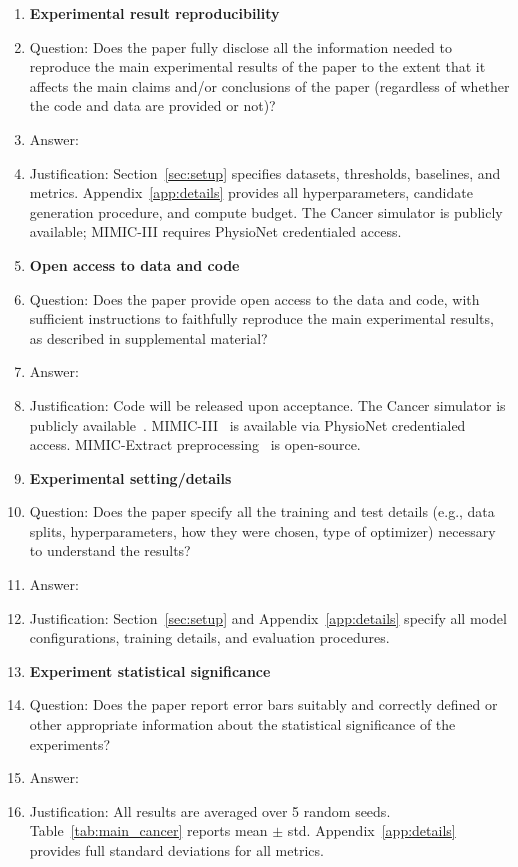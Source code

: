 \documentclass{article}
\begin{document}
\begin{enumerate}
\item {\bf Experimental result reproducibility}
    \item[] Question: Does the paper fully disclose all the information needed to reproduce the main experimental results of the paper to the extent that it affects the main claims and/or conclusions of the paper (regardless of whether the code and data are provided or not)?
    \item[] Answer: \answerYes{}
    \item[] Justification: Section~\ref{sec:setup} specifies datasets, thresholds, baselines, and metrics. Appendix~\ref{app:details} provides all hyperparameters, candidate generation procedure, and compute budget. The Cancer simulator is publicly available; MIMIC-III requires PhysioNet credentialed access.

\item {\bf Open access to data and code}
    \item[] Question: Does the paper provide open access to the data and code, with sufficient instructions to faithfully reproduce the main experimental results, as described in supplemental material?
    \item[] Answer: \answerYes{}
    \item[] Justification: Code will be released upon acceptance. The Cancer simulator is publicly available~\citep{bica2020cancer}. MIMIC-III~\citep{johnson2016mimic} is available via PhysioNet credentialed access. MIMIC-Extract preprocessing~\citep{wang2020mimic} is open-source.

\item {\bf Experimental setting/details}
    \item[] Question: Does the paper specify all the training and test details (e.g., data splits, hyperparameters, how they were chosen, type of optimizer) necessary to understand the results?
    \item[] Answer: \answerYes{}
    \item[] Justification: Section~\ref{sec:setup} and Appendix~\ref{app:details} specify all model configurations, training details, and evaluation procedures.

\item {\bf Experiment statistical significance}
    \item[] Question: Does the paper report error bars suitably and correctly defined or other appropriate information about the statistical significance of the experiments?
    \item[] Answer: \answerYes{}
    \item[] Justification: All results are averaged over 5 random seeds. Table~\ref{tab:main_cancer} reports mean $\pm$ std. Appendix~\ref{app:details} provides full standard deviations for all metrics.


\end{enumerate}
\end{document}
